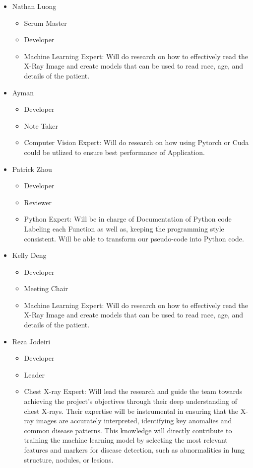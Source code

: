 \documentclass{article}
\begin{document}
\begin{itemize}
\item Nathan Luong
    \begin{itemize}
        \item Scrum Master
        \item Developer
        \item Machine Learning Expert: Will do research on how to effectively read the X-Ray Image and create models that can be used to read race, age, and details of the patient. 
    \end{itemize}
    \item Ayman
    \begin{itemize}
        \item Developer
        \item Note Taker
        \item Computer Vision Expert: Will do research on how using Pytorch or Cuda could be utlized to ensure best performance of Application. 
    \end{itemize}
\item Patrick Zhou
    \begin{itemize}
        \item Developer
        \item Reviewer
        \item Python Expert: Will be in charge of Documentation of Python code Labeling each Function as well as, keeping the programming style consistent. Will be able to transform our pseudo-code into Python code. 
    \end{itemize}
        
\item Kelly Deng
    \begin{itemize}
        \item Developer
        \item Meeting Chair
        \item Machine Learning Expert: Will do research on how to effectively read the X-Ray Image and create models that can be used to read race, age, and details of the patient. 
    \end{itemize}
\item Reza Jodeiri
    \begin{itemize}
        \item Developer
        \item Leader 
        \item Chest X-ray Expert: Will lead the research and guide the team towards achieving the project’s objectives through their deep understanding of chest X-rays. Their expertise will be instrumental in ensuring that the X-ray images are accurately interpreted, identifying key anomalies and common disease patterns. This knowledge will directly contribute to training the machine learning model by selecting the most relevant features and markers for disease detection, such as abnormalities in lung structure, nodules, or lesions. 
    \end{itemize}
\end{itemize}
  
\end{document}

